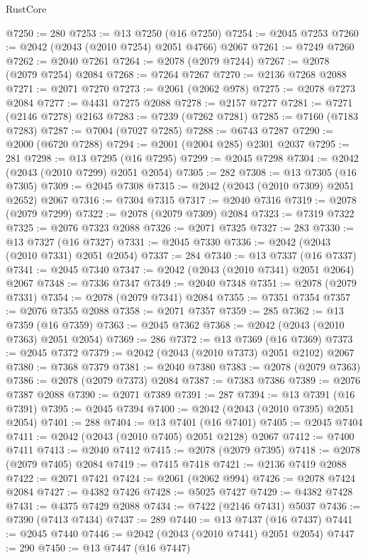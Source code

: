 \begin{lexlean}{RustCore}
\begin{coremodule}
@7250 := 280
@7253 := @13 @7250 (@16 @7250)
@7254 := @2045 @7253
@7260 := @2042 (@2043 (@2010 @7254) @2051 @4766) @2067
@7261 := @7249 @7260
@7262 := @2040 @7261
@7264 := @2078 (@2079 @7244)
@7267 := @2078 (@2079 @7254) @2084
@7268 := @7264 @7267
@7270 := @2136 @7268 @2088
@7271 := @2071 @7270
@7273 := @2061 (@2062 @978)
@7275 := @2078 @7273 @2084
@7277 := @4431 @7275 @2088
@7278 := @2157 @7277
@7281 := @7271 (@2146 @7278) @2163
@7283 := @7239 (@7262 @7281)
@7285 := @7160 (@7183 @7283)
@7287 := @7004 (@7027 @7285)
@7288 := @6743 @7287
@7290 := @2000 (@6720 @7288)
@7294 := @2001 (@2004 @285) @2301 @2037
@7295 := 281
@7298 := @13 @7295 (@16 @7295)
@7299 := @2045 @7298
@7304 := @2042 (@2043 (@2010 @7299) @2051 @2054)
@7305 := 282
@7308 := @13 @7305 (@16 @7305)
@7309 := @2045 @7308
@7315 := @2042 (@2043 (@2010 @7309) @2051 @2652) @2067
@7316 := @7304 @7315
@7317 := @2040 @7316
@7319 := @2078 (@2079 @7299)
@7322 := @2078 (@2079 @7309) @2084
@7323 := @7319 @7322
@7325 := @2076 @7323 @2088
@7326 := @2071 @7325
@7327 := 283
@7330 := @13 @7327 (@16 @7327)
@7331 := @2045 @7330
@7336 := @2042 (@2043 (@2010 @7331) @2051 @2054)
@7337 := 284
@7340 := @13 @7337 (@16 @7337)
@7341 := @2045 @7340
@7347 := @2042 (@2043 (@2010 @7341) @2051 @2064) @2067
@7348 := @7336 @7347
@7349 := @2040 @7348
@7351 := @2078 (@2079 @7331)
@7354 := @2078 (@2079 @7341) @2084
@7355 := @7351 @7354
@7357 := @2076 @7355 @2088
@7358 := @2071 @7357
@7359 := 285
@7362 := @13 @7359 (@16 @7359)
@7363 := @2045 @7362
@7368 := @2042 (@2043 (@2010 @7363) @2051 @2054)
@7369 := 286
@7372 := @13 @7369 (@16 @7369)
@7373 := @2045 @7372
@7379 := @2042 (@2043 (@2010 @7373) @2051 @2102) @2067
@7380 := @7368 @7379
@7381 := @2040 @7380
@7383 := @2078 (@2079 @7363)
@7386 := @2078 (@2079 @7373) @2084
@7387 := @7383 @7386
@7389 := @2076 @7387 @2088
@7390 := @2071 @7389
@7391 := 287
@7394 := @13 @7391 (@16 @7391)
@7395 := @2045 @7394
@7400 := @2042 (@2043 (@2010 @7395) @2051 @2054)
@7401 := 288
@7404 := @13 @7401 (@16 @7401)
@7405 := @2045 @7404
@7411 := @2042 (@2043 (@2010 @7405) @2051 @2128) @2067
@7412 := @7400 @7411
@7413 := @2040 @7412
@7415 := @2078 (@2079 @7395)
@7418 := @2078 (@2079 @7405) @2084
@7419 := @7415 @7418
@7421 := @2136 @7419 @2088
@7422 := @2071 @7421
@7424 := @2061 (@2062 @994)
@7426 := @2078 @7424 @2084
@7427 := @4382 @7426
@7428 := @5025 @7427
@7429 := @4382 @7428
@7431 := @4375 @7429 @2088
@7434 := @7422 (@2146 @7431) @5037
@7436 := @7390 (@7413 @7434)
@7437 := 289
@7440 := @13 @7437 (@16 @7437)
@7441 := @2045 @7440
@7446 := @2042 (@2043 (@2010 @7441) @2051 @2054)
@7447 := 290
@7450 := @13 @7447 (@16 @7447)

\end{coremodule}
\end{lexlean}
